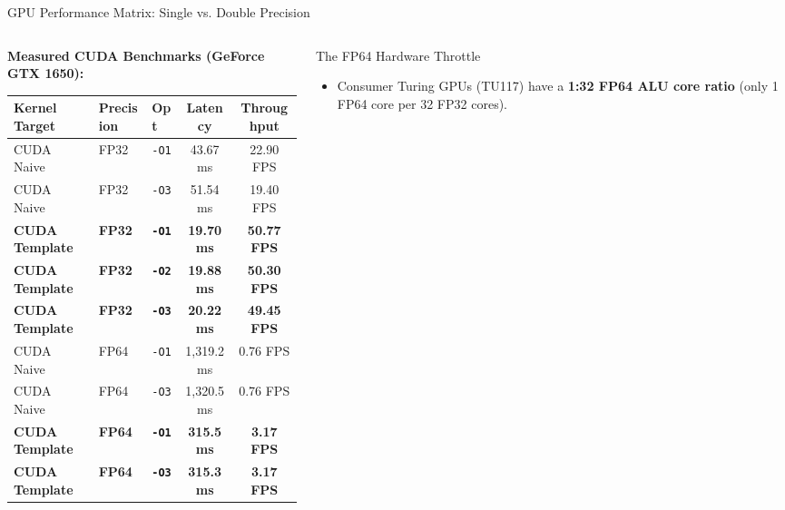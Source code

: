 \documentclass[aspectratio=169,10pt]{beamer}
\begin{document}
\begin{frame}{GPU Performance Matrix: Single vs. Double Precision}
  \begin{columns}[T]
    \begin{column}{0.54\textwidth}
      \textbf{Measured CUDA Benchmarks (GeForce GTX 1650):}
      \begin{table}
        \centering
        \tiny
        \begin{tabular}{@{}lllcc@{}}
          \toprule
          Kernel Target & Precision & Opt & Latency & Throughput \\
          \midrule
          CUDA Naive & FP32 & \texttt{-O1} & 43.67 ms & 22.90 FPS \\
          CUDA Naive & FP32 & \texttt{-O3} & 51.54 ms & 19.40 FPS \\
          \textbf{CUDA Template} & \textbf{FP32} & \textbf{\texttt{-O1}} & \textbf{19.70 ms} & \textbf{50.77 FPS} \\
          \textbf{CUDA Template} & \textbf{FP32} & \textbf{\texttt{-O2}} & \textbf{19.88 ms} & \textbf{50.30 FPS} \\
          \textbf{CUDA Template} & \textbf{FP32} & \textbf{\texttt{-O3}} & \textbf{20.22 ms} & \textbf{49.45 FPS} \\
          \midrule
          CUDA Naive & FP64 & \texttt{-O1} & 1,319.2 ms & 0.76 FPS \\
          CUDA Naive & FP64 & \texttt{-O3} & 1,320.5 ms & 0.76 FPS \\
          \textbf{CUDA Template} & \textbf{FP64} & \textbf{\texttt{-O1}} & \textbf{315.5 ms} & \textbf{3.17 FPS} \\
          \textbf{CUDA Template} & \textbf{FP64} & \textbf{\texttt{-O3}} & \textbf{315.3 ms} & \textbf{3.17 FPS} \\
          \bottomrule
        \end{tabular}
      \end{table}
    \end{column}
    \begin{column}{0.46\textwidth}
      \begin{alertblock}{The FP64 Hardware Throttle}
        \scriptsize
        \begin{itemize}
          \item Consumer Turing GPUs (TU117) have a \textbf{1:32 FP64 ALU core ratio} (only 1 FP64 core per 32 FP32 cores).

\end{itemize}
\end{alertblock}
\end{column}
\end{columns}
\end{frame}
\end{document}
